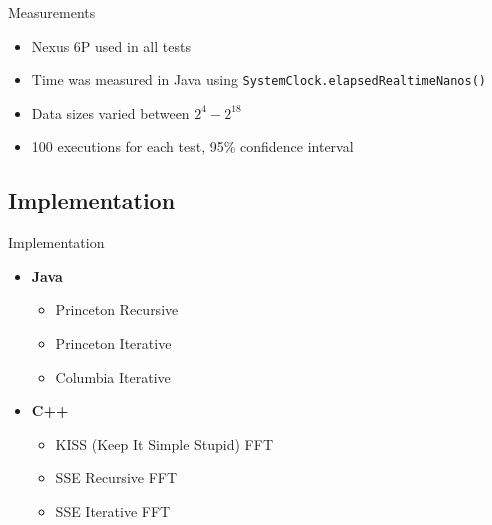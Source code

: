 \documentclass[xcolor={table}]{beamer}
\begin{document}
\begin{frame}{Measurements}
    \begin{itemize}
        \item Nexus 6P used in all tests
        \item Time was measured in Java using \texttt{SystemClock.elapsedRealtimeNanos()}
        \item Data sizes varied between $2^4 - 2^{18}$
        \item 100 executions for each test, 95\% confidence interval
    \end{itemize}
\end{frame}

\subsection{Implementation}

\begin{frame}{Implementation}
    \begin{itemize}[<+->]
        \item \textbf{Java}
            \begin{itemize}[<.->]
                \item Princeton Recursive
                \item Princeton Iterative
                \item Columbia Iterative
            \end{itemize}
        \item \textbf{C++}
            \begin{itemize}[<.->]
                \item KISS (Keep It Simple Stupid) FFT
                \item SSE Recursive FFT
                \item SSE Iterative FFT
            \end{itemize}
    \end{itemize}
\end{frame}
\end{document}
